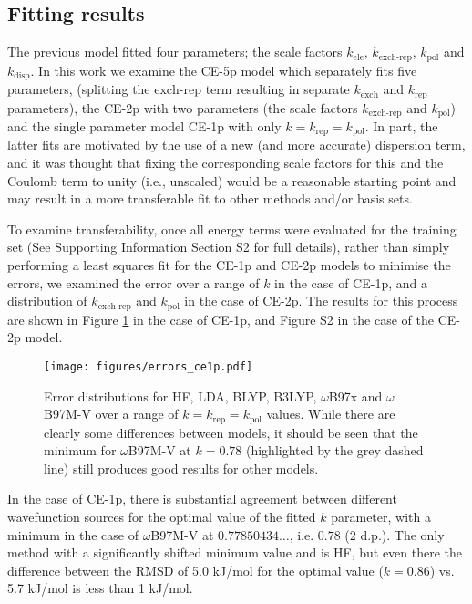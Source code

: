\documentclass[preprint]{iucr}              %
\begin{document}
\subsection{Fitting results}

The previous model fitted four parameters; the scale factors $k_\text{ele}$, $k_\text{exch-rep}$, $k_\text{pol}$ and $k_\text{disp}$.
In this work we examine the CE-5p model which separately fits five parameters, (splitting  the $\text{exch-rep}$ term resulting in separate
$k_\text{exch}$ and $k_\text{rep}$ parameters),
the CE-2p with two parameters (the scale factors $k_\text{exch-rep}$ and $k_\text{pol}$) and the single parameter model CE-1p with
only $k = k_\text{rep} = k_\text{pol}$. In part, the latter fits are motivated by
the use of a new (and more accurate) dispersion term, and it was thought that fixing the corresponding scale factors for this and the 
Coulomb term to unity (i.e., unscaled) would be a reasonable starting point and may result in a more transferable fit to other methods 
and/or basis sets.

To examine transferability, once all energy terms were evaluated for the training set 
(See Supporting Information Section S2 %
for full details), 
rather than simply performing a least squares fit for the CE-1p and CE-2p models 
to minimise the errors, we examined the error over a
range of $k$ in the case of CE-1p, and a distribution of $k_\text{exch-rep}$ and $k_\text{pol}$ in the case of CE-2p.
The results for this process are shown in Figure \ref{fig:1_parameter_minima} in the case of CE-1p, and Figure S2 %
in the case of the CE-2p model.

\begin{figure}
    \centering
    \texttt{[image: figures/errors\_ce1p.pdf]}
    \label{fig:1_parameter_minima}
    \caption{Error distributions for HF, LDA, BLYP, B3LYP, $\omega$B97x and $\omega$B97M-V over a range of $k = k_\text{rep} = k_\text{pol}$ values.
    While there are clearly some differences between models, it should be seen that the minimum for $\omega$B97M-V at $k=0.78$ (highlighted by the
    grey dashed line) still produces good results for other models.}
\end{figure}

In the case of CE-1p, there is substantial agreement between different wavefunction sources for the optimal value of the fitted
$k$ parameter, with a minimum in the case of $\omega$B97M-V at $0.77850434\ldots$, i.e. $0.78$ (2 d.p.).
The only method with a significantly shifted minimum
value and is HF, but even there the difference between the RMSD of 5.0 kJ/mol for the optimal value ($k=0.86$) vs.
5.7 kJ/mol is less than 1 kJ/mol.
\end{document}
